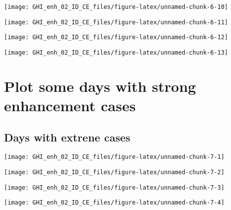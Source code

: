 \documentclass[
  10pt,
  a4paper,oneside]{article}
\begin{document}
\begin{center}\texttt{[image: GHI\_enh\_02\_ID\_CE\_files/figure-latex/unnamed-chunk-6-10]} \end{center}

\begin{center}\texttt{[image: GHI\_enh\_02\_ID\_CE\_files/figure-latex/unnamed-chunk-6-11]} \end{center}

\begin{center}\texttt{[image: GHI\_enh\_02\_ID\_CE\_files/figure-latex/unnamed-chunk-6-12]} \end{center}

\begin{center}\texttt{[image: GHI\_enh\_02\_ID\_CE\_files/figure-latex/unnamed-chunk-6-13]} \end{center}

\FloatBarrier

\hypertarget{plot-some-days-with-strong-enhancement-cases}{%
\section{Plot some days with strong enhancement cases}\label{plot-some-days-with-strong-enhancement-cases}}

\FloatBarrier

\hypertarget{days-with-extrene-cases}{%
\subsection{Days with extrene cases}\label{days-with-extrene-cases}}

\begin{center}\texttt{[image: GHI\_enh\_02\_ID\_CE\_files/figure-latex/unnamed-chunk-7-1]} \end{center}

\begin{center}\texttt{[image: GHI\_enh\_02\_ID\_CE\_files/figure-latex/unnamed-chunk-7-2]} \end{center}

\begin{center}\texttt{[image: GHI\_enh\_02\_ID\_CE\_files/figure-latex/unnamed-chunk-7-3]} \end{center}

\begin{center}\texttt{[image: GHI\_enh\_02\_ID\_CE\_files/figure-latex/unnamed-chunk-7-4]} \end{center}
\end{document}
